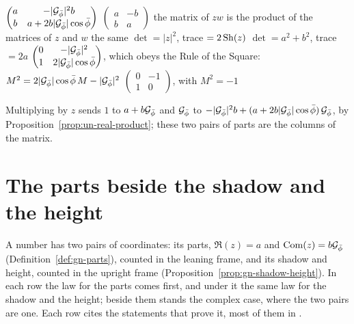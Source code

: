 \begin{gnlaws}
  {$\begin{pmatrix} a & -|\mathcal{G}_{\bar{\phi}}|^2 b \\ b & a + 2b|\mathcal{G}_{\bar{\phi}}|\cos\bar{\phi} \end{pmatrix}$}
  {$\begin{pmatrix} a & -b \\ b & a \end{pmatrix}$}
  {the matrix of $zw$ is the product of the matrices of $z$ and $w$}
  {the same}
  {$\det = |z|^2$, \quad trace $= 2\operatorname{Sh}(z)$}
  {$\det = a^2 + b^2$, \quad trace $= 2a$}
  {$\begin{pmatrix} 0 & -|\mathcal{G}_{\bar{\phi}}|^2 \\ 1 & 2|\mathcal{G}_{\bar{\phi}}|\cos\bar{\phi} \end{pmatrix}$, which obeys the Rule of the Square: $M^2 = 2|\mathcal{G}_{\bar{\phi}}|\cos\bar{\phi}\,M - |\mathcal{G}_{\bar{\phi}}|^2$}
  {$\begin{pmatrix} 0 & -1 \\ 1 & 0 \end{pmatrix}$, with $M^2 = -1$}
\end{gnlaws}
Multiplying by $z$ sends $1$ to $a + b\mathcal{G}_{\bar{\phi}}$ and $\mathcal{G}_{\bar{\phi}}$ to $-|\mathcal{G}_{\bar{\phi}}|^2 b + (a + 2b|\mathcal{G}_{\bar{\phi}}|\cos\bar{\phi})\,\mathcal{G}_{\bar{\phi}}$, by Proposition~\ref{prop:un-real-product}; these two pairs of parts are the columns of the matrix.

\section{The parts beside the shadow and the height}\label{app:f-parts}

A number has two pairs of coordinates: its parts, $\Re(z) = a$ and $\operatorname{Com}(z) = b\mathcal{G}_{\bar{\phi}}$ (Definition~\ref{def:gn-parts}), counted in the leaning frame, and its shadow and height, counted in the upright frame (Proposition~\ref{prop:gn-shadow-height}). In each row the law for the parts comes first, and under it the same law for the shadow and the height; beside them stands the complex case, where the two pairs are one. Each row cites the statements that prove it, most of them in .


